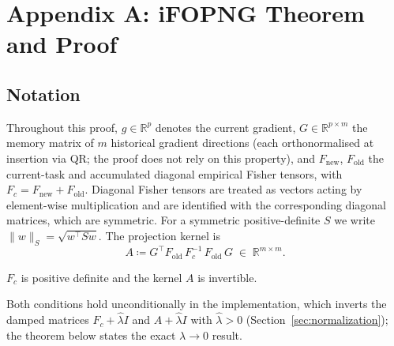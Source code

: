 \section*{Appendix A: iFOPNG Theorem and Proof}
\label{app:a}


\subsection*{Notation}

Throughout this proof, $g \in \mathbb{R}^p$ denotes the current gradient,
$G \in \mathbb{R}^{p \times m}$ the memory matrix of $m$ historical gradient
directions (each orthonormalised at insertion via QR; the proof does not
rely on this property), and $F_{\mathrm{new}}$, $F_{\mathrm{old}}$ the
current-task and accumulated diagonal empirical Fisher tensors, with
$F_c = F_{\mathrm{new}} + F_{\mathrm{old}}$.
Diagonal Fisher tensors are treated as vectors acting by element-wise
multiplication and are identified with the corresponding diagonal matrices,
which are symmetric.
For a symmetric positive-definite $S$ we write $\|w\|_S = \sqrt{w^\top S w}$.
The projection kernel is
\begin{equation}
    A \coloneqq G^\top F_{\mathrm{old}}\, F_c^{-1}\, F_{\mathrm{old}}\, G
    \;\in\; \mathbb{R}^{m \times m}.
\end{equation}

\begin{assumption}[Regularity]
\label{ass:regularity}
$F_c$ is positive definite and the kernel $A$ is invertible.
\end{assumption}

\noindent
Both conditions hold unconditionally in the implementation, which inverts the
damped matrices $F_c + \hat\lambda I$ and $A + \hat\lambda I$ with
$\hat\lambda > 0$ (Section~\ref{sec:normalization}); the theorem below states
the exact $\lambda \to 0$ result.

